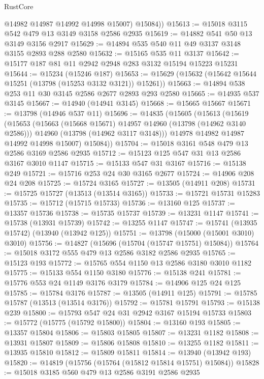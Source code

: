 \begin{lexlean}{RustCore}
\begin{coremodule}
          @14982
          @14987
          @14992
          @14998
          @15007)
        @15084))
@15613 := @15018 @3115 @542 @479 @13 @3149 @3158 @2586 @2935
@15619 := @14882 @541 @50 @13 @3149 @3156 @2917
@15629 := @14894 @535 @540 @11 @49 @3137 @3148 @3155 @2893 @288 @2580
@15632 := @15165 @535 @11 @3137
@15642 := @15177 @187 @81 @11 @2942 @2948 @283 @3132 @15194 @15223 @15231
@15644 := @15234 (@15246 @187)
@15653 := @15629 (@15632 (@15642 @15644 @15251 (@13798 (@15253 @3132 @3121)) @15261))
@15663 := @14894 @538 @253 @11 @30 @3145 @2586 @2677 @2893 @293 @2580
@15665 := @14935 @537 @3145
@15667 := @14940 (@14941 @3145)
@15668 := @15665 @15667
@15671 := @13798 (@14946 @537 @11)
@15696 := @14835
    (@15605
      (@15613
        (@15619
          (@15653
            (@15663 (@15668 @15671) @14957 @14960 (@13798 (@14962 @3140 @2586)))
            @14960
            (@13798 (@14962 @3117 @3148)))
          @14978
          @14982
          @14987
          @14992
          @14998
          @15007)
        @15084))
@15704 := @15018 @3161 @548 @479 @13 @2586 @3169 @2586 @2935
@15712 := @15123 @125 @547 @31 @13 @2586 @3167 @3010 @1147
@15715 := @15133 @547 @31 @3167
@15716 := @15138 @249
@15721 := @15716 @253 @24 @30 @3165 @2677
@15724 := @14906 @208 @24 @208
@15725 := @15724 @3165
@15727 := @13505 (@14911 @208)
@15731 := @15725 @15727 (@13513 (@13514 @3165))
@15733 := @15721 @15731 @15283
@15735 := @15712 (@15715 @15733)
@15736 := @13160 @125
@15737 := @13357 @15736
@15738 := @15735 @15737
@15739 := @13231 @1147
@15741 := @15738 (@13931 @15739)
@15742 := @13255 @1147
@15747 := @15741 (@13935 @15742) (@13940 (@13942 @125))
@15751 := @13798 (@15000 (@15001 @3010) @3010)
@15756 := @14827 (@15696 (@15704 (@15747 @15751) @15084))
@15764 := @15018 @3172 @555 @479 @13 @2586 @3182 @2586 @2935
@15765 := @15123 @193
@15772 := @15765 @554 @1150 @13 @2586 @3180 @3010 @1182
@15775 := @15133 @554 @1150 @3180
@15776 := @15138 @241
@15781 := @15776 @553 @24 @1149 @3176 @3179
@15784 := @14906 @125 @24 @125
@15785 := @15784 @3176
@15787 := @13505 (@14911 @125)
@15791 := @15785 @15787 (@13513 (@13514 @3176))
@15792 := @15781 @15791
@15793 := @15138 @239
@15800 := @15793 @547 @24 @31 @2942 @3167 @15194 @15733
@15803 := @15772 (@15775 (@15792 @15800))
@15804 := @13160 @193
@15805 := @13357 @15804
@15806 := @15803 @15805
@15807 := @13231 @1182
@15808 := @13931 @15807
@15809 := @15806 @15808
@15810 := @13255 @1182
@15811 := @13935 @15810
@15812 := @15809 @15811
@15814 := @13940 (@13942 @193)
@15820 := @14819 (@15756 (@15764 (@15812 @15814 @15751) @15084))
@15828 := @15018 @3185 @560 @479 @13 @2586 @3191 @2586 @2935

\end{coremodule}
\end{lexlean}
